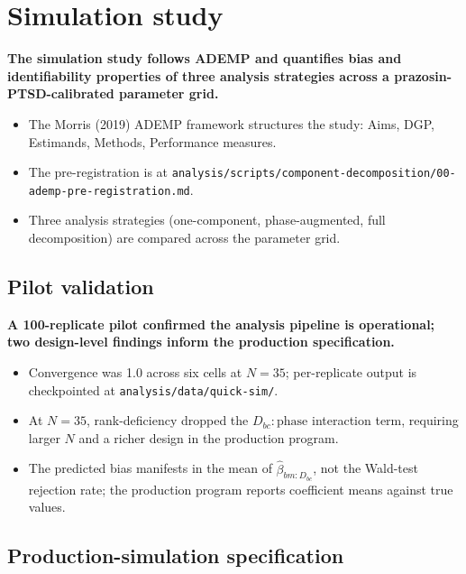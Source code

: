 \documentclass[
  11pt,
]{article}
\begin{document}
\section{Simulation study}\label{simulation-study}

\textbf{The simulation study follows ADEMP and quantifies bias and identifiability properties of three analysis strategies across a prazosin-PTSD-calibrated parameter grid.}

\begin{itemize}\setlength{\itemsep}{2pt}\setlength{\parskip}{0pt}
\item The Morris (2019) ADEMP framework structures the study: Aims, DGP, Estimands, Methods, Performance measures.
\item The pre-registration is at \texttt{analysis/scripts/component-decomposition/00-ademp-pre-registration.md}.
\item Three analysis strategies (one-component, phase-augmented, full decomposition) are compared across the parameter grid.
\end{itemize}

\subsection{Pilot validation}\label{pilot-validation}

\textbf{A 100-replicate pilot confirmed the analysis pipeline is operational; two design-level findings inform the production specification.}

\begin{itemize}\setlength{\itemsep}{2pt}\setlength{\parskip}{0pt}
\item Convergence was 1.0 across six cells at $N = 35$; per-replicate output is checkpointed at \texttt{analysis/data/quick-sim/}.
\item At $N = 35$, rank-deficiency dropped the $D_{bc}{:}\text{phase}$ interaction term, requiring larger $N$ and a richer design in the production program.
\item The predicted bias manifests in the mean of $\hat\beta_{bm:D_{bc}}$, not the Wald-test rejection rate; the production program reports coefficient means against true values.
\end{itemize}

\subsection{Production-simulation specification}\label{production-simulation-specification}
\end{document}
